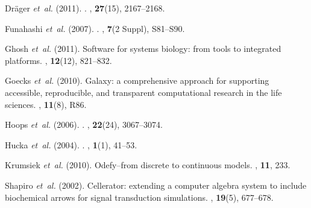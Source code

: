 \documentclass{bioinfo}
\begin{document}
\begin{thebibliography}{}
Dr{\"a}ger {\em et~al.} (2011).
.
\newblock {\em \Bioinformatics\/}, {\bf 27}(15), 2167--2168.


Funahashi {\em et~al.} (2007).
.
, {\bf 7}(2 Suppl), S81--S90.

Ghosh {\em et~al.} (2011).
\newblock Software for systems biology: from tools to integrated platforms.
, {\bf 12}(12), 821--832.

Goecks {\em et~al.} (2010).
\newblock Galaxy: a comprehensive approach for supporting accessible,
  reproducible, and transparent computational research in the life sciences.
, {\bf 11}(8), R86.

Hoops {\em et~al.} (2006).
.
\newblock {\em \Bioinformatics\/}, {\bf 22}(24), 3067--3074.

Hucka {\em et~al.} (2004).
.
, {\bf 1}(1), 41--53.

Krumsiek {\em et~al.} (2010).
\newblock Odefy--from discrete to continuous models.
, {\bf 11}, 233.

Shapiro {\em et~al.} (2002).
\newblock Cellerator: extending a computer algebra system to include
  biochemical arrows for signal transduction simulations.
\newblock {\em \Bioinformatics\/}, {\bf 19}(5), 677--678.


\end{thebibliography}
\end{document}
